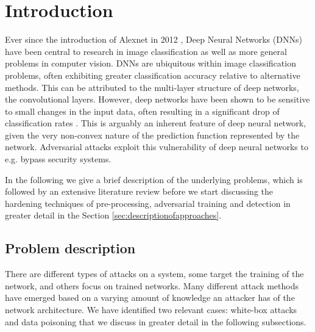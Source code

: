 \section{Introduction}

Ever since the introduction of Alexnet in 2012 \cite{krizhevsky2012imagenet}, Deep Neural Networks (DNNs) have been central to research in image classification as well as more general problems in computer vision. DNNs are ubiquitous within image classification problems, often exhibiting greater classification accuracy relative to alternative methods. This can be attributed to the multi-layer structure of deep networks, the convolutional layers. However, deep networks have been shown to be sensitive to small changes in the input data, often resulting in a significant drop of classification rates \cite{Szegedy13}. This is arguably an inherent feature of deep neural network, given the very non-convex nature of the prediction function represented by the network. Adversarial attacks exploit this vulnerability of deep neural networks to e.g. bypass security systems.

In the following we give a brief description of the underlying problems, which is followed by an extensive literature review before we start discussing the hardening techniques of pre-processing, adversarial training and detection in greater detail in the Section \ref{sec:descriptionofapproaches}.

\subsection{Problem description}

There are different types of attacks on a system, some target the training of the network, and others focus on trained networks. Many different attack methods have emerged based on a varying amount of knowledge an attacker has of the network architecture. We have identified two relevant cases: white-box attacks and data poisoning that we discuss in greater detail in the following subsections. 


